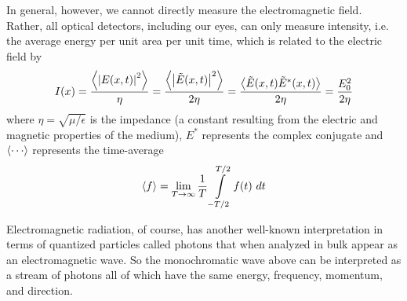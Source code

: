 In general, however, we cannot directly measure the electromagnetic field. Rather, all optical detectors, including our eyes, can only measure intensity, i.e. the average energy per unit area per unit time, which is related to the electric field by
\begin{equation} \label{eq:field_intensity}
I(x) = \frac{\expval{\abs{E(x,t)}^2}}{\eta} 
= \frac{\expval{\abs{\tilde{E}(x,t)}^2}}{2\eta} 
= \frac{\expval{\tilde{E}(x,t)\tilde{E}^*(x,t)}}{2\eta} 
= \frac{E_0^2}{2\eta}
\end{equation}
where $\eta = \sqrt{\mu/\epsilon}$ is the impedance (a constant resulting from the electric and magnetic properties of the medium), $E^*$ represents the complex conjugate and $\expval{\cdots}$ represents the time-average
\begin{equation}
\expval{f} = \lim\limits_{T\rightarrow\infty} \frac{1}{T} \int\limits_{-T/2}^{T/2} f(t)~dt
\end{equation}


Electromagnetic radiation, of course, has another well-known interpretation in terms of quantized particles called photons that when analyzed in bulk appear as an electromagnetic wave. So the monochromatic wave above can be interpreted as a stream of photons all of which have the same energy, frequency, momentum, and direction.

